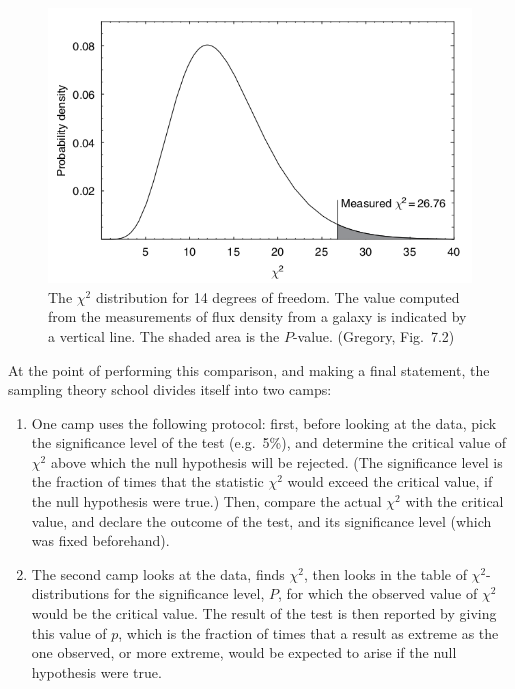 \documentclass[%
oneside,                 %
final,                   %
10pt]{article}
\begin{document}
\begin{figure}[!ht]  %
  \centerline{\includegraphics[width=0.8\linewidth]{fig/gregory_7_2.png}}
  \caption{
  The $\chi^2$ distribution for 14 degrees of freedom. The value computed from the measurements of flux density from a galaxy is indicated by a vertical line. The shaded area is the $P$-value. (Gregory, Fig.~7.2)
  }
\end{figure}



At the point of performing this comparison, and making a final statement, the sampling theory school divides itself into two camps:

\begin{enumerate}
\item One camp uses the following protocol: first, before looking at the data, pick the significance level of the test (e.g.~5\%), and determine the critical value of $\chi^2$ above which the null hypothesis will be rejected. (The significance level is the fraction of times that the statistic $\chi^2$ would exceed the critical value, if the null hypothesis were true.) Then, compare the actual $\chi^2$ with the critical value, and declare the outcome of the test, and its significance level (which was fixed beforehand).

\item The second camp looks at the data, finds $\chi^2$, then looks in the table of $\chi^2$-distributions for the significance level, $P$, for which the observed value of $\chi^2$ would be the critical value. The result of the test is then reported by giving this value of $p$, which is the fraction of times that a result as extreme as the one observed, or more extreme, would be expected to arise if the null hypothesis were true. 
\end{enumerate}
\end{document}

